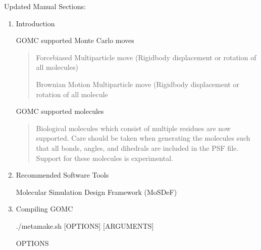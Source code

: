 \documentclass[letterpaper,10pt,english]{sphinxmanual}
\begin{document}
\sphinxAtStartPar
Updated Manual Sections:
\begin{enumerate}
%
\item {} 
\sphinxAtStartPar
Introduction

\sphinxAtStartPar
GOMC supported Monte Carlo moves
\begin{quote}

\sphinxAtStartPar
Force\sphinxhyphen{}biased Multiparticle move (Rigid\sphinxhyphen{}body displacement or rotation of all molecules)

\sphinxAtStartPar
Brownian Motion Multiparticle move (Rigid\sphinxhyphen{}body displacement or rotation of all molecule
\end{quote}

\sphinxAtStartPar
GOMC supported molecules
\begin{quote}

\sphinxAtStartPar
Biological molecules which consist of multiple residues are now supported.  Care should be taken when generating the molecules such that all bonds, angles, and dihedrals are included in the PSF file.  Support for these molecules is experimental.
\end{quote}

\item {} 
\sphinxAtStartPar
Recommended Software Tools

\sphinxAtStartPar
Molecular Simulation Design Framework (MoSDeF)

\item {} 
\sphinxAtStartPar
Compiling GOMC

\sphinxAtStartPar
./metamake.sh {[}OPTIONS{]} {[}ARGUMENTS{]}

\sphinxAtStartPar
OPTIONS
\begin{quote}
\end{quote}


\end{enumerate}
\end{document}
